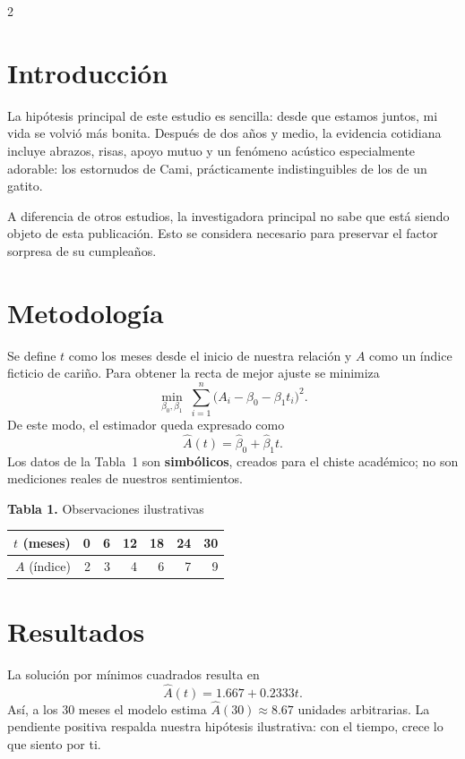 \documentclass[10pt,letterpaper]{article}
\begin{document}
\begin{multicols}{2}
\section{Introducción}
La hipótesis principal de este estudio es sencilla: desde que estamos juntos, mi vida se volvió más bonita. Después de dos años y medio, la evidencia cotidiana incluye abrazos, risas, apoyo mutuo y un fenómeno acústico especialmente adorable: los estornudos de Cami, prácticamente indistinguibles de los de un gatito.

A diferencia de otros estudios, la investigadora principal no sabe que está siendo objeto de esta publicación. Esto se considera necesario para preservar el factor sorpresa de su cumpleaños.

\section{Metodología}
Se define $t$ como los meses desde el inicio de nuestra relación y $A$ como un índice ficticio de cariño. Para obtener la recta de mejor ajuste se minimiza
\begin{equation}
\min_{\beta_0,\beta_1}\;\sum_{i=1}^{n}\bigl(A_i-\beta_0-\beta_1t_i\bigr)^2.
\end{equation}
De este modo, el estimador queda expresado como
\begin{equation}
\widehat A(t)=\widehat\beta_0+\widehat\beta_1t.
\end{equation}
Los datos de la Tabla~1 son \textbf{simbólicos}, creados para el chiste académico; no son mediciones reales de nuestros sentimientos.

\begin{center}
\small
\textbf{Tabla 1.} Observaciones ilustrativas\par\vspace{3pt}
\begin{tabular}{@{}rrrrrrr@{}}
\toprule
$t$ (meses)&0&6&12&18&24&30\\
\midrule
$A$ (índice)&2&3&4&6&7&9\\
\bottomrule
\end{tabular}
\end{center}

\section{Resultados}
La solución por mínimos cuadrados resulta en
\begin{equation}
\boxed{\widehat A(t)=1.667+0.2333t.}
\end{equation}
Así, a los 30 meses el modelo estima $\widehat A(30)\approx8.67$ unidades arbitrarias. La pendiente positiva respalda nuestra hipótesis ilustrativa: con el tiempo, crece lo que siento por ti.


\end{multicols}
\end{document}
